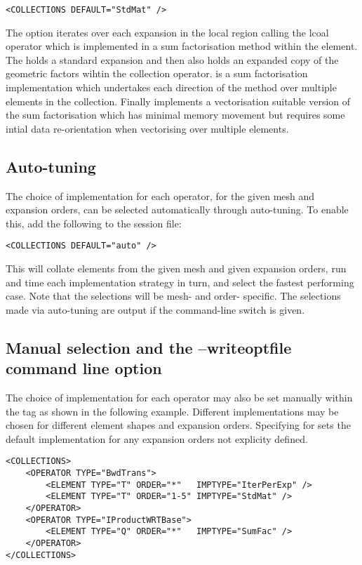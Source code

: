 \begin{lstlisting}[style=XmlStyle]
<COLLECTIONS DEFAULT="StdMat" />
\end{lstlisting}

The  option iterates over each expansion
in the local region calling the lcoal operator which is implemented in
a sum factorisation method within the element. The 
holds a standard expansion and then also holds an expanded copy of the
geometric factors wihtin the collection operator.  is a
sum factorisation implementation which undertakes each direction of
the method over multiple elements in the collection. Finally
 implements a vectorisation suitable version of the
sum factorisation which has minimal memory movement but requires some
intial data re-orientation when vectorising over multiple elements. 

\subsection{Auto-tuning}
The choice of implementation for each operator, for the given mesh and
expansion orders, can be selected automatically through 
auto-tuning. To enable this, add the following to the \nekpp session
file:

\begin{lstlisting}[style=XmlStyle]
<COLLECTIONS DEFAULT="auto" />
\end{lstlisting}

This will collate elements from the given mesh and given expansion orders,
run and time each implementation strategy in turn, and select the fastest
performing case. Note that the selections will be mesh- and order- specific.
The selections made via auto-tuning are output if the 
command-line switch is given.

\subsection{Manual selection and the --writeoptfile command line option}
The choice of implementation for each operator may also be set
manually within the  tag as shown in the following
example. Different implementations may be chosen for different element
shapes and expansion orders.  Specifying \inltt{*} for 
sets the default implementation for any expansion orders not explicity
defined.

\begin{lstlisting}[style=XmlStyle]
<COLLECTIONS>
    <OPERATOR TYPE="BwdTrans">
        <ELEMENT TYPE="T" ORDER="*"   IMPTYPE="IterPerExp" />
        <ELEMENT TYPE="T" ORDER="1-5" IMPTYPE="StdMat" />
    </OPERATOR>
    <OPERATOR TYPE="IProductWRTBase">
        <ELEMENT TYPE="Q" ORDER="*"   IMPTYPE="SumFac" />
    </OPERATOR>
</COLLECTIONS>
\end{lstlisting}

